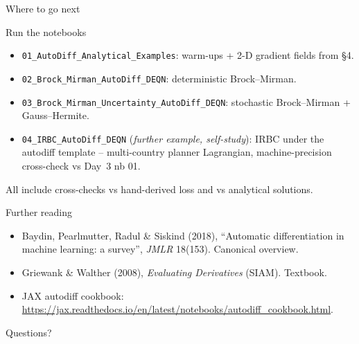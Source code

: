 \documentclass[aspectratio=169,11pt]{beamer}
\begin{document}
\begin{frame}[fragile]{Where to go next}
\footnotesize
\begin{block}{Run the notebooks}
\begin{itemize}\itemsep1pt
\item \texttt{01\_AutoDiff\_Analytical\_Examples}: warm-ups + 2-D gradient fields from \S 4.
\item \texttt{02\_Brock\_Mirman\_AutoDiff\_DEQN}: deterministic Brock--Mirman.
\item \texttt{03\_Brock\_Mirman\_Uncertainty\_AutoDiff\_DEQN}: stochastic Brock--Mirman + Gauss--Hermite.
\item \texttt{04\_IRBC\_AutoDiff\_DEQN} (\emph{further example, self-study}): IRBC under the autodiff template -- multi-country planner Lagrangian, machine-precision cross-check vs Day~3 nb 01.
\end{itemize}
All include cross-checks vs hand-derived loss and vs analytical solutions.
\end{block}
\begin{block}{Further reading}
\begin{itemize}\itemsep1pt
\item Baydin, Pearlmutter, Radul \& Siskind (2018), ``Automatic differentiation in machine learning: a survey'', \emph{JMLR} 18(153). Canonical overview.
\item Griewank \& Walther (2008), \emph{Evaluating Derivatives} (SIAM). Textbook.
\item JAX autodiff cookbook: \url{https://jax.readthedocs.io/en/latest/notebooks/autodiff_cookbook.html}.
\end{itemize}
\end{block}
\centerline{Questions?}
\end{frame}
\end{document}
